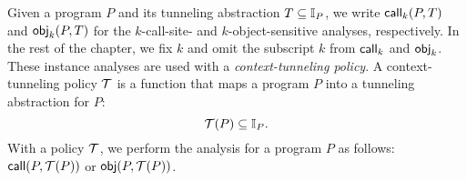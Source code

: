 Given  a program $P$ and 
its tunneling abstraction $T \subseteq \mathbb{I}_P$, 
we write ${\sf call}_k(P, T)$ and
${\sf obj}_k(P, T)$ for the $k$-call-site- and
$k$-object-sensitive analyses, respectively. In the rest of the chapter, we fix $k$ and omit the subscript $k$ from ${\sf call}_k$ and ${\sf obj}_k$. 
%
%
%
These instance analyses are used with a {\em context-tunneling policy}. 
A context-tunneling policy $\mathcal{T}$ is a function that maps a program $P$ into
a tunneling abstraction for $P$: 
\[
  \mathcal{T}(P) \subseteq \mathbb{I}_P.
\]
With a policy $\mathcal{T}$, 
we  perform the analysis for a program $P$ as follows: ${\sf call}(P, \mathcal{T}(P))$ or ${\sf obj}(P, \mathcal{T}(P))$. 



